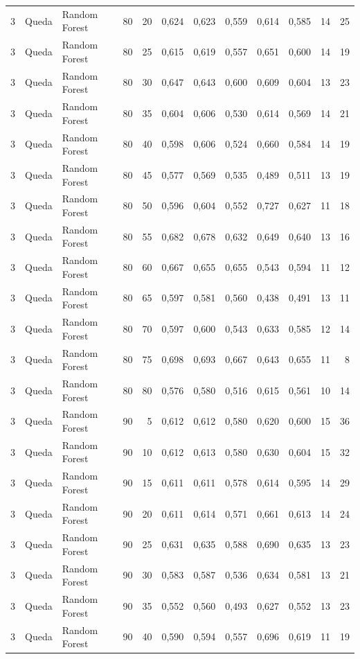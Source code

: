 \begin{longtable}{@{}rllrrrrrrrrr@{}}
3 & Queda & Random Forest & 80 & 20 & 0,624 & 0,623 & 0,559 & 0,614 & 0,585 & 14 & 25 \\
3 & Queda & Random Forest & 80 & 25 & 0,615 & 0,619 & 0,557 & 0,651 & 0,600 & 14 & 19 \\
3 & Queda & Random Forest & 80 & 30 & 0,647 & 0,643 & 0,600 & 0,609 & 0,604 & 13 & 23 \\
3 & Queda & Random Forest & 80 & 35 & 0,604 & 0,606 & 0,530 & 0,614 & 0,569 & 14 & 21 \\
3 & Queda & Random Forest & 80 & 40 & 0,598 & 0,606 & 0,524 & 0,660 & 0,584 & 14 & 19 \\
3 & Queda & Random Forest & 80 & 45 & 0,577 & 0,569 & 0,535 & 0,489 & 0,511 & 13 & 19 \\
3 & Queda & Random Forest & 80 & 50 & 0,596 & 0,604 & 0,552 & 0,727 & 0,627 & 11 & 18 \\
3 & Queda & Random Forest & 80 & 55 & 0,682 & 0,678 & 0,632 & 0,649 & 0,640 & 13 & 16 \\
3 & Queda & Random Forest & 80 & 60 & 0,667 & 0,655 & 0,655 & 0,543 & 0,594 & 11 & 12 \\
3 & Queda & Random Forest & 80 & 65 & 0,597 & 0,581 & 0,560 & 0,438 & 0,491 & 13 & 11 \\
3 & Queda & Random Forest & 80 & 70 & 0,597 & 0,600 & 0,543 & 0,633 & 0,585 & 12 & 14 \\
3 & Queda & Random Forest & 80 & 75 & 0,698 & 0,693 & 0,667 & 0,643 & 0,655 & 11 & 8 \\
3 & Queda & Random Forest & 80 & 80 & 0,576 & 0,580 & 0,516 & 0,615 & 0,561 & 10 & 14 \\
3 & Queda & Random Forest & 90 & 5 & 0,612 & 0,612 & 0,580 & 0,620 & 0,600 & 15 & 36 \\
3 & Queda & Random Forest & 90 & 10 & 0,612 & 0,613 & 0,580 & 0,630 & 0,604 & 15 & 32 \\
3 & Queda & Random Forest & 90 & 15 & 0,611 & 0,611 & 0,578 & 0,614 & 0,595 & 14 & 29 \\
3 & Queda & Random Forest & 90 & 20 & 0,611 & 0,614 & 0,571 & 0,661 & 0,613 & 14 & 24 \\
3 & Queda & Random Forest & 90 & 25 & 0,631 & 0,635 & 0,588 & 0,690 & 0,635 & 13 & 23 \\
3 & Queda & Random Forest & 90 & 30 & 0,583 & 0,587 & 0,536 & 0,634 & 0,581 & 13 & 21 \\
3 & Queda & Random Forest & 90 & 35 & 0,552 & 0,560 & 0,493 & 0,627 & 0,552 & 13 & 23 \\
3 & Queda & Random Forest & 90 & 40 & 0,590 & 0,594 & 0,557 & 0,696 & 0,619 & 11 & 19 \\

\end{longtable}
